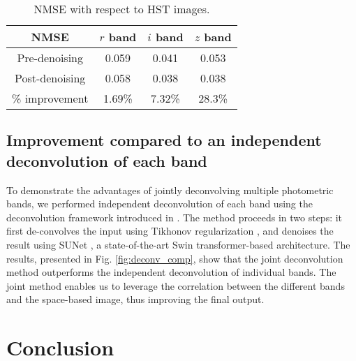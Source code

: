 \documentclass[traditabstract]{aa}
\begin{document}
\begin{table}[h!]
    \centering
    \renewcommand{\arraystretch}{1.3}
        \caption{NMSE with respect to HST images.}
    \begin{tabular}{cccc}
        \hline
        \textbf{NMSE} & \textbf{$r $ band} & \textbf{$i$ band} & \textbf{$z$ band}\\
        \hline
        Pre-denoising & 0.059 & 0.041 & 0.053\\
        Post-denoising & 0.058 & 0.038 & 0.038\\
        \hline
        \% improvement & 1.69\% & 7.32\% & 28.3\%\\
        \hline
    \end{tabular}
    \label{tab:clusters}
\end{table}

\subsection{Improvement compared to an independent deconvolution of each band}
\label{sec:sunet_deconv} 

To demonstrate the advantages of jointly deconvolving multiple photometric bands, we performed independent deconvolution of each band using the deconvolution framework introduced in \cite{sunet_akhaury}. The method proceeds in two steps: it first de-convolves the input using Tikhonov regularization \citep{tikhonov1977solutions}, and denoises the result using SUNet \citep{sunet}, a state-of-the-art Swin transformer-based architecture. The results, presented in Fig. \ref{fig:deconv_comp}, show that the joint deconvolution method outperforms the independent deconvolution of individual bands. The joint method enables us to leverage the correlation between the different bands and the space-based image, thus improving the final output.


\section{Conclusion}
\label{concl}
\end{document}
